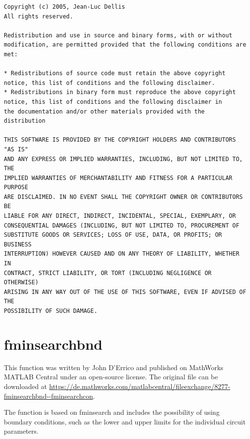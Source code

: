 \documentclass[10pt,a4paper,oneside]{book}
\begin{document}
\begin{small}
\begin{verbatim}
Copyright (c) 2005, Jean-Luc Dellis
All rights reserved.

Redistribution and use in source and binary forms, with or without
modification, are permitted provided that the following conditions are
met:

* Redistributions of source code must retain the above copyright
notice, this list of conditions and the following disclaimer.
* Redistributions in binary form must reproduce the above copyright
notice, this list of conditions and the following disclaimer in
the documentation and/or other materials provided with the distribution

THIS SOFTWARE IS PROVIDED BY THE COPYRIGHT HOLDERS AND CONTRIBUTORS "AS IS"
AND ANY EXPRESS OR IMPLIED WARRANTIES, INCLUDING, BUT NOT LIMITED TO, THE
IMPLIED WARRANTIES OF MERCHANTABILITY AND FITNESS FOR A PARTICULAR PURPOSE
ARE DISCLAIMED. IN NO EVENT SHALL THE COPYRIGHT OWNER OR CONTRIBUTORS BE
LIABLE FOR ANY DIRECT, INDIRECT, INCIDENTAL, SPECIAL, EXEMPLARY, OR
CONSEQUENTIAL DAMAGES (INCLUDING, BUT NOT LIMITED TO, PROCUREMENT OF
SUBSTITUTE GOODS OR SERVICES; LOSS OF USE, DATA, OR PROFITS; OR BUSINESS
INTERRUPTION) HOWEVER CAUSED AND ON ANY THEORY OF LIABILITY, WHETHER IN
CONTRACT, STRICT LIABILITY, OR TORT (INCLUDING NEGLIGENCE OR OTHERWISE)
ARISING IN ANY WAY OUT OF THE USE OF THIS SOFTWARE, EVEN IF ADVISED OF THE
POSSIBILITY OF SUCH DAMAGE.
\end{verbatim}
\end{small}


\section{fminsearchbnd}

This function was written by John D'Errico and published on MathWorks MATLAB Central under an open-source license. The original file can be downloaded at \url{https://de.mathworks.com/matlabcentral/fileexchange/8277-fminsearchbnd--fminsearchcon}.

The function is based on fminsearch and includes the possibility of using boundary conditions, such as the lower and upper limits for the individual circuit parameters.
\end{document}
